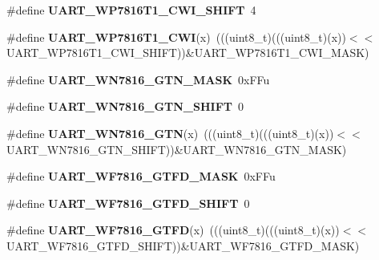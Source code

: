 \begin{DoxyCompactItemize}
\item 
\#define {\bfseries U\+A\+R\+T\+\_\+\+W\+P7816\+T1\+\_\+\+C\+W\+I\+\_\+\+S\+H\+I\+FT}~4\hypertarget{group__UART__Register__Masks_gaf78c95bd8fe42dfe6caeb8b9c8190e61}{}\label{group__UART__Register__Masks_gaf78c95bd8fe42dfe6caeb8b9c8190e61}

\item 
\#define {\bfseries U\+A\+R\+T\+\_\+\+W\+P7816\+T1\+\_\+\+C\+WI}(x)~(((uint8\+\_\+t)(((uint8\+\_\+t)(x))$<$$<$U\+A\+R\+T\+\_\+\+W\+P7816\+T1\+\_\+\+C\+W\+I\+\_\+\+S\+H\+I\+FT))\&U\+A\+R\+T\+\_\+\+W\+P7816\+T1\+\_\+\+C\+W\+I\+\_\+\+M\+A\+SK)\hypertarget{group__UART__Register__Masks_ga4536e184765ba4b5fc283551be80dccc}{}\label{group__UART__Register__Masks_ga4536e184765ba4b5fc283551be80dccc}

\item 
\#define {\bfseries U\+A\+R\+T\+\_\+\+W\+N7816\+\_\+\+G\+T\+N\+\_\+\+M\+A\+SK}~0x\+F\+Fu\hypertarget{group__UART__Register__Masks_ga2ca85f017d51ef94ac685ce60d365795}{}\label{group__UART__Register__Masks_ga2ca85f017d51ef94ac685ce60d365795}

\item 
\#define {\bfseries U\+A\+R\+T\+\_\+\+W\+N7816\+\_\+\+G\+T\+N\+\_\+\+S\+H\+I\+FT}~0\hypertarget{group__UART__Register__Masks_gab7deaf09ea769ec9cb28b66bfc90d141}{}\label{group__UART__Register__Masks_gab7deaf09ea769ec9cb28b66bfc90d141}

\item 
\#define {\bfseries U\+A\+R\+T\+\_\+\+W\+N7816\+\_\+\+G\+TN}(x)~(((uint8\+\_\+t)(((uint8\+\_\+t)(x))$<$$<$U\+A\+R\+T\+\_\+\+W\+N7816\+\_\+\+G\+T\+N\+\_\+\+S\+H\+I\+FT))\&U\+A\+R\+T\+\_\+\+W\+N7816\+\_\+\+G\+T\+N\+\_\+\+M\+A\+SK)\hypertarget{group__UART__Register__Masks_gace5f01806058a7519f09ca698a48dedd}{}\label{group__UART__Register__Masks_gace5f01806058a7519f09ca698a48dedd}

\item 
\#define {\bfseries U\+A\+R\+T\+\_\+\+W\+F7816\+\_\+\+G\+T\+F\+D\+\_\+\+M\+A\+SK}~0x\+F\+Fu\hypertarget{group__UART__Register__Masks_gafe82535b1014fd5cc4cfd50169d743ac}{}\label{group__UART__Register__Masks_gafe82535b1014fd5cc4cfd50169d743ac}

\item 
\#define {\bfseries U\+A\+R\+T\+\_\+\+W\+F7816\+\_\+\+G\+T\+F\+D\+\_\+\+S\+H\+I\+FT}~0\hypertarget{group__UART__Register__Masks_ga721ba0567ed0305bffa0ee30353aa2c8}{}\label{group__UART__Register__Masks_ga721ba0567ed0305bffa0ee30353aa2c8}

\item 
\#define {\bfseries U\+A\+R\+T\+\_\+\+W\+F7816\+\_\+\+G\+T\+FD}(x)~(((uint8\+\_\+t)(((uint8\+\_\+t)(x))$<$$<$U\+A\+R\+T\+\_\+\+W\+F7816\+\_\+\+G\+T\+F\+D\+\_\+\+S\+H\+I\+FT))\&U\+A\+R\+T\+\_\+\+W\+F7816\+\_\+\+G\+T\+F\+D\+\_\+\+M\+A\+SK)\hypertarget{group__UART__Register__Masks_ga1deec30c17d2cc28d8db76346756785f}{}\label{group__UART__Register__Masks_ga1deec30c17d2cc28d8db76346756785f}


\end{DoxyCompactItemize}
